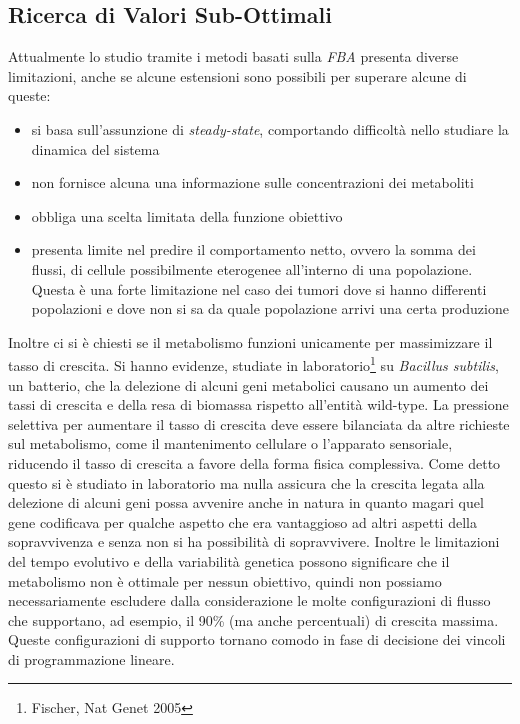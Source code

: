 \documentclass[a4paper,12pt, oneside]{book}
\begin{document}
\subsection{Ricerca di Valori Sub-Ottimali}
Attualmente lo studio tramite i metodi basati sulla \textit{FBA} presenta
diverse limitazioni, anche se alcune estensioni sono possibili per superare
alcune di queste:
\begin{itemize}
  \item si basa sull'assunzione di \textit{steady-state}, comportando difficoltà
  nello studiare la dinamica del sistema
  \item non fornisce alcuna una informazione sulle concentrazioni dei
  metaboliti 
  \item obbliga una scelta limitata della funzione obiettivo
  \item presenta limite nel predire il comportamento netto, ovvero la somma dei
  flussi, di cellule possibilmente eterogenee all'interno di una
  popolazione. Questa è una forte limitazione nel caso dei tumori dove si hanno
  differenti popolazioni e dove non si sa da quale popolazione arrivi una certa
  produzione  
\end{itemize}
Inoltre ci si è chiesti se il metabolismo funzioni unicamente per massimizzare
il tasso di crescita. Si hanno evidenze, studiate in
laboratorio\footnote{Fischer, Nat Genet 2005} su \textit{Bacillus subtilis}, un
batterio, che la delezione di alcuni geni metabolici causano un aumento dei
tassi di crescita e della resa di biomassa rispetto all'entità wild-type. La
pressione selettiva per aumentare il tasso di crescita deve essere bilanciata da
altre richieste sul metabolismo, come il mantenimento cellulare o l'apparato
sensoriale, riducendo il tasso di crescita a favore della forma fisica
complessiva. Come detto questo si è studiato in laboratorio ma nulla assicura
che la crescita legata alla delezione di alcuni geni possa avvenire anche in
natura in quanto magari quel gene codificava per qualche aspetto che era
vantaggioso ad altri aspetti della sopravvivenza e senza non si ha possibilità
di sopravvivere. Inoltre le limitazioni del tempo evolutivo e della variabilità
genetica possono significare che il metabolismo non è ottimale per nessun
obiettivo, quindi non possiamo necessariamente escludere dalla considerazione
le molte configurazioni di flusso che supportano, ad esempio, il 90\% (ma anche
percentuali) di crescita massima. Queste configurazioni di supporto tornano
comodo in fase di decisione dei vincoli di programmazione lineare.\\
\end{document}
